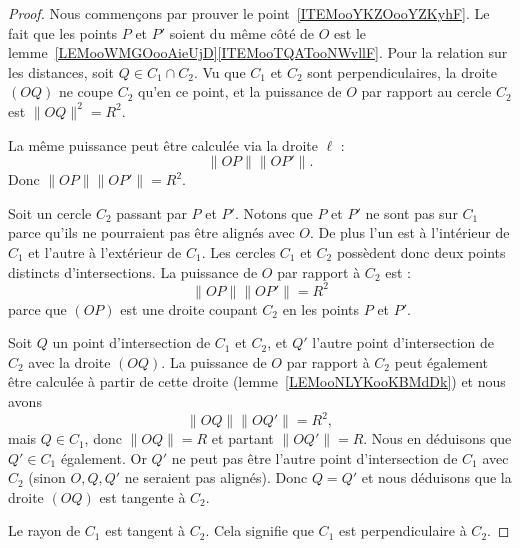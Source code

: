 \begin{proof}
    Nous commençons par prouver le point~\ref{ITEMooYKZOooYZKyhF}. Le fait que les points \( P\) et \( P'\) soient du même côté de \( O\) est le lemme~\ref{LEMooWMGOooAieUjD}\ref{ITEMooTQATooNWvllF}. Pour la relation sur les distances, soit \( Q\in C_1\cap C_2\). Vu que \( C_1\) et \( C_2\) sont perpendiculaires, la droite \( (OQ)\) ne coupe \( C_2\) qu'en ce point, et la puissance de \( O\) par rapport au cercle \( C_2\) est \( \| OQ \|^2=R^2\).

    La même puissance peut être calculée via la droite \( \ell\) :
    \begin{equation}
        \| OP \|\| OP' \|.
    \end{equation}
    Donc \( \| OP \|\| OP' \|=R^2\).

    Soit un cercle \( C_2\) passant par \( P\) et \( P'\). Notons que \( P\) et \( P'\) ne sont pas sur \( C_1\) parce qu'ils ne pourraient pas être alignés avec \( O\). De plus l'un est à l'intérieur de \( C_1\) et l'autre à l'extérieur de \( C_1\). Les cercles \( C_1\) et \( C_2\) possèdent donc deux points distincts d'intersections.
    La puissance de \( O\) par rapport à \( C_2\) est :
    \begin{equation}
        \| OP \|\| OP' \|=R^2
    \end{equation}
    parce que \( (OP)\) est une droite coupant \( C_2\) en les points \( P\) et \( P'\).

    Soit \( Q\) un point d'intersection de \( C_1\) et \( C_2\), et \( Q'\) l'autre point d'intersection de \( C_2\) avec la droite \( (OQ)\). La puissance de \( O\) par rapport à \( C_2\) peut également être calculée à partir de cette droite (lemme~\ref{LEMooNLYKooKBMdDk}) et nous avons
    \begin{equation}
        \| OQ \|\| OQ' \|=R^2,
    \end{equation}
    mais \( Q\in C_1\), donc \( \| OQ \|=R\) et partant \( \| OQ' \|=R\). Nous en déduisons que \( Q'\in C_1\) également. Or \( Q'\) ne peut pas être l'autre point d'intersection de \( C_1\) avec \( C_2\) (sinon \( O,Q,Q'\) ne seraient pas alignés). Donc \( Q=Q'\) et nous déduisons que la droite \( (OQ)\) est tangente à \( C_2\).

    Le rayon de \( C_1\) est tangent à \( C_2\). Cela signifie que $C_1$ est perpendiculaire à \( C_2\).
\end{proof}

